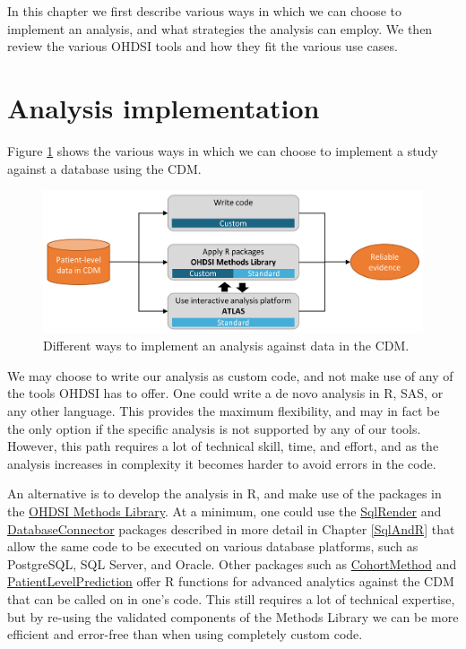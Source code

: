\documentclass[11pt]{book}
\theoremstyle{definition}
\theoremstyle{definition}
\theoremstyle{definition}
\theoremstyle{remark}
\begin{document}
In this chapter we first describe various ways in which we can choose to implement an analysis, and what strategies the analysis can employ. We then review the various OHDSI tools and how they fit the various use cases.

\hypertarget{analysisImplementation}{%
\section{Analysis implementation}\label{analysisImplementation}}

Figure \ref{fig:implementations} shows the various ways in which we can choose to implement a study against a database using the CDM. 

\begin{figure}

{\centering \includegraphics[width=0.9\linewidth]{images/OhdsiAnalyticsTools/implementations} 

}

\caption{Different ways to implement an analysis against data in the CDM.}\label{fig:implementations}
\end{figure}

We may choose to write our analysis as custom code, and not make use of any of the tools OHDSI has to offer. One could write a de novo analysis in R, SAS, or any other language. This provides the maximum flexibility, and may in fact be the only option if the specific analysis is not supported by any of our tools. However, this path requires a lot of technical skill, time, and effort, and as the analysis increases in complexity it becomes harder to avoid errors in the code.

An alternative is to develop the analysis in R, and make use of the packages in the \href{https://ohdsi.github.io/MethodsLibrary/}{OHDSI Methods Library}. At a minimum, one could use the \href{https://ohdsi.github.io/SqlRender/}{SqlRender} and \href{https://ohdsi.github.io/DatabaseConnector/}{DatabaseConnector} packages described in more detail in Chapter \ref{SqlAndR} that allow the same code to be executed on various database platforms, such as PostgreSQL, SQL Server, and Oracle. Other packages such as \href{https://ohdsi.github.io/CohortMethod/}{CohortMethod} and \href{https://ohdsi.github.io/PatientLevelPrediction/}{PatientLevelPrediction} offer R functions for advanced analytics against the CDM that can be called on in one's code. This still requires a lot of technical expertise, but by re-using the validated components of the Methods Library we can be more efficient and error-free than when using completely custom code.
\end{document}

